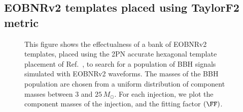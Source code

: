 \subsection{EOBNRv2 templates placed using TaylorF2 metric}
\begin{figure}
	\begin{center}
	\end{center}
\caption{This figure shows the effectualness of a bank of EOBNRv2 templates,
placed using the 2PN accurate hexagonal template placement of
Ref.~\citep{BabaketalBankPlacement}, to search for a population of BBH signals
simulated with EOBNRv2 waveforms. The masses of the BBH population are chosen
from a uniform distribution of component masses between $3$ and $25\,
M_{\odot}$. For each injection, we plot the component masses of the injection,
and the fitting factor $\left(\FF\right)$.} \label{fig:match_eobeob_all}
\end{figure}


